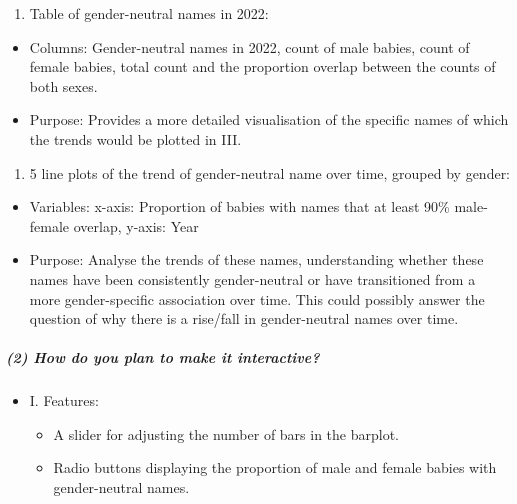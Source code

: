 \documentclass[
]{article}
\providecommand{\tightlist}{%
  \setlength{\itemsep}{0pt}\setlength{\parskip}{0pt}}
\begin{document}
\begin{enumerate}
\def\labelenumi{\Roman{enumi}.}
\setcounter{enumi}{1}
\tightlist
\item
  Table of gender-neutral names in 2022:
\end{enumerate}

\begin{itemize}
\tightlist
\item
  Columns: Gender-neutral names in 2022, count of male babies, count of
  female babies, total count and the proportion overlap between the
  counts of both sexes.
\item
  Purpose: Provides a more detailed visualisation of the specific names
  of which the trends would be plotted in III.
\end{itemize}

\begin{enumerate}
\def\labelenumi{\Roman{enumi}.}
\setcounter{enumi}{2}
\tightlist
\item
  5 line plots of the trend of gender-neutral name over time, grouped by
  gender:
\end{enumerate}

\begin{itemize}
\tightlist
\item
  Variables: x-axis: Proportion of babies with names that at least 90\%
  male-female overlap, y-axis: Year
\item
  Purpose: Analyse the trends of these names, understanding whether
  these names have been consistently gender-neutral or have transitioned
  from a more gender-specific association over time. This could possibly
  answer the question of why there is a rise/fall in gender-neutral
  names over time.
\end{itemize}

\hypertarget{how-do-you-plan-to-make-it-interactive}{%
\subparagraph{\texorpdfstring{\textbf{(2) How do you plan to make it
interactive?}}{(2) How do you plan to make it interactive?}}\label{how-do-you-plan-to-make-it-interactive}}

\begin{itemize}
\tightlist
\item
  I. Features:

  \begin{itemize}
  \tightlist
  \item
    A slider for adjusting the number of bars in the barplot.
  \item
    Radio buttons displaying the proportion of male and female babies
    with gender-neutral names.
  \end{itemize}
\end{itemize}
\end{document}
